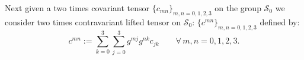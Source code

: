 \documentclass{article}
\theoremstyle{definition}
\theoremstyle{remark}
\newcommand{\er}{\eqref}
\newcommand{\er}{\eqref}
\begin{document}
Next given a two times covariant tensor $\{c_{mn}\}_{m,n=0,1,2,3}$
on the group $\mathcal{S}_0$
we consider two times contravariant lifted tensor
on $\mathcal{S}_0$: $\{c^{mn}\}_{m,n=0,1,2,3}$
defined by:
\begin{equation}\label{fgjfjhgghhgjghjhjkkkkgjghghuiiiulkkjlkklKKint}
c^{mn}:=\sum_{k=0}^{3}\sum_{j=0}^{3}g^{mj}g^{nk}c_{jk}
\quad\quad\forall\, m,n=0,1,2,3.
\end{equation}
%
%
%
\begin{comment}
We rewrite \er{fgjfjhgghhgjghjhjkkkkgjghghuiiiulkkjlkklKKint} as:
\begin{multline}\label{khjhhkfgjfjhgghhgjghjhjkkkkgjghghuiiiulkkjlkklKKgfgint}
c^{mn}=g^{m0}g^{n0}c_{00}+\sum_{k=1}^{3}g^{m0}g^{nk}c_{0k}+\sum_{j=1}^{3}g^{mj}g^{n0}c_{j0}+\sum_{k=1}^{3}\sum_{j=1}^{3}g^{mj}g^{nk}c_{jk}
\quad\forall\, m,n=0,1,2,3.
\end{multline}
In particular, by inserting
\er{hoyuiouigyfghgjh3478zzrrZZffGGjkkjint} and
\er{hoyuiouigyfg3478zzrrZZffGGhhjhjint} into
\er{khjhhkfgjfjhgghhgjghjhjkkkkgjghghuiiiulkkjlkklKKgfgint} we
deduce:
\begin{equation}\label{khjhhkfgjfjhgghhgjghjhjkkkkgjghghuiiiulkkjlkklKKgfgjhjjghgjhint}
\begin{cases}
c^{00}=c_{00}+\sum_{k=1}^{3}\frac{v_k}{c}c_{0k}+\sum_{j=1}^{3}\frac{v_j}{c}c_{j0}+\sum_{k=1}^{3}\sum_{j=1}^{3}\frac{v_j}{c}\frac{v_k}{c}c_{jk}
\\
c^{m0}=
\frac{v_m}{c}c^{00}-c_{m0}-\sum_{k=1}^{3}\frac{v_k}{c}c_{mk}
\quad\forall\, m=1,2,3,
\\
c^{0n}=\frac{v_n}{c}c^{00}
-c_{0n} -\sum_{j=1}^{3}\frac{v_j}{c}c_{jn} \quad\forall\, n=1,2,3,
\\

\end{comment}
\end{document}
